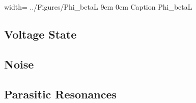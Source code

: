 


{width=\textwidth}
{../Figures/Phi_betaL}
{9cm}
{0cm}
{Caption} 
{Phi_betaL}

\subsection{Voltage State}

\subsection{Noise}

\subsection{Parasitic Resonances}



